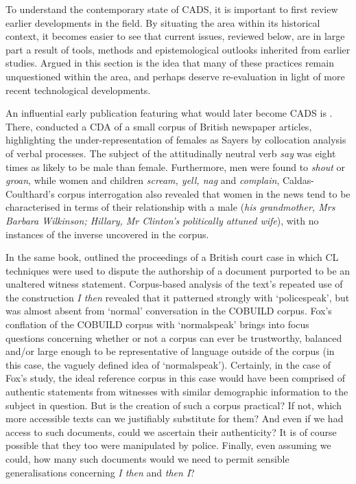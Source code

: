 
To understand the contemporary state of \gls{CADS}, it is important to first review earlier developments in the field. By situating the area within its historical context, it becomes easier to see that current issues, reviewed below, are in large part a result of tools, methods and epistemological outlooks inherited from earlier studies. Argued in this section is the idea that many of these practices remain unquestioned within the area, and perhaps deserve re\hyp{}evaluation in light of more recent technological developments.

An influential early publication featuring what would later become \gls{CADS} is . There, \textcite{caldas-coulthard_discourse_1993} conducted a \gls{CDA} of a small \gls{corpus} of British newspaper articles, highlighting the under\hyp{}representation of females as Sayers by collocation analysis of verbal processes. The subject of the attitudinally neutral verb \emph{say} was eight times as likely to be male than female. Furthermore, men were found to \emph{shout} or \emph{groan}, while women and children \emph{scream, yell, nag} and \emph{complain}, Caldas-Coulthard's \gls{corpus} interrogation also revealed that women in the news tend to be characterised in terms of their relationship with a male (\emph{his grandmother, Mrs Barbara Wilkinson; Hillary, Mr Clinton's politically attuned wife}), with no instances of the inverse uncovered in the \gls{corpus}. 

In the same book, \textcite{fox_comparison_1993} outlined the proceedings of a British court case in which \gls{CL} techniques were used to dispute the authorship of a document purported to be an unaltered witness statement. Corpus-based analysis of the text's repeated use of the construction \emph{I then} revealed that it patterned strongly with `policespeak', but was almost absent from `normal' conversation in the COBUILD \gls{corpus}. Fox's conflation of the COBUILD \gls{corpus} with `normalspeak' brings into focus questions concerning whether or not a \gls{corpus} can ever be trustworthy, balanced and\slash or large enough to be representative of language outside of the \gls{corpus} (in this case, the vaguely defined idea of `normalspeak'). Certainly, in the case of Fox's study, the ideal reference \gls{corpus} in this case would have been comprised of authentic statements from witnesses with similar demographic information to the subject in question. But is the creation of such a \gls{corpus} practical? If not, which more accessible texts can we justifiably substitute for them? And even if we had access to such documents, could we ascertain their authenticity? It is of course possible that they too were manipulated by police. Finally, even assuming we could, how many such documents would we need to permit sensible generalisations concerning \emph{I then} and \emph{then I}?

